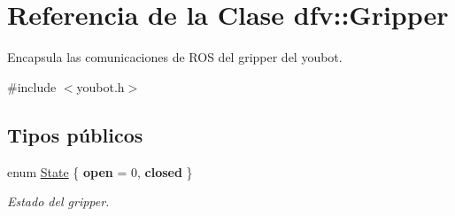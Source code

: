 \hypertarget{classdfv_1_1Gripper}{\section{\-Referencia de la \-Clase dfv\-:\-:\-Gripper}
\label{classdfv_1_1Gripper}
}


\-Encapsula las comunicaciones de \-R\-O\-S del gripper del youbot.  




{\ttfamily \#include $<$youbot.\-h$>$}

\subsection*{\-Tipos públicos}
\begin{DoxyCompactItemize}
\item 
enum \hyperlink{classdfv_1_1Gripper_a891fbbf96286d8615cb16957fb3bcaf2}{\-State} \{ {\bfseries open} =  0, 
{\bfseries closed}
 \}
\begin{DoxyCompactList}\small\item\em \-Estado del gripper. \end{DoxyCompactList}\end{DoxyCompactItemize}
